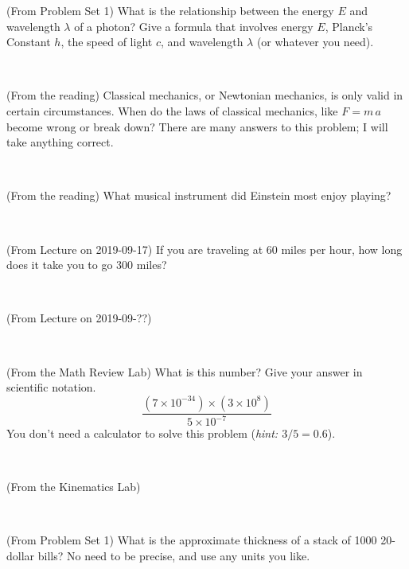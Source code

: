 \documentclass[12pt, letterpaper]{article}
\begin{document}
\begin{problem} (From Problem Set 1)
What is the relationship between the energy $E$ and wavelength
$\lambda$ of a photon? Give a formula that involves energy $E$,
Planck's Constant $h$, the speed of light $c$, and wavelength
$\lambda$ (or whatever you need).
\end{problem}

\vfill ~

\begin{problem} (From the reading)
Classical mechanics, or Newtonian mechanics, is only valid in certain
circumstances. When do the laws of classical mechanics, like $F =
m\,a$ become wrong or break down? There are many answers to this
problem; I will take anything correct.
\end{problem}


\vfill ~

\begin{problem} (From the reading)
What musical instrument did Einstein most enjoy playing?
\end{problem}


\vfill ~

\begin{problem} (From Lecture on 2019-09-17)
If you are traveling at 60 miles per hour, how long does
it take you to go 300 miles?
\end{problem}


\vfill ~


\clearpage


\begin{problem} (From Lecture on 2019-09-??)
\end{problem}


\vfill ~

\begin{problem} (From the Math Review Lab)
What is this number? Give your answer in scientific notation.
$$
\frac{(7\times10^{-34})\times(3\times10^8)}{5\times10^{-7}}
$$
You don't need a calculator to solve this problem (\textit{hint: $3/5=0.6$}).
\end{problem}


\vfill ~

\begin{problem} (From the Kinematics Lab)

\end{problem}


\vfill ~

\begin{problem} (From Problem Set 1)
What is the approximate thickness of a stack of 1000 20-dollar bills?
No need to be precise, and use any units you like.
\end{problem}
\end{document}

